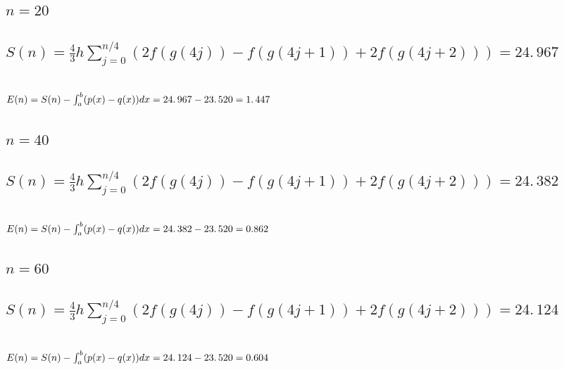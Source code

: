 \documentclass{article}
\begin{document}
\bigskip

\subsection{\protect\bigskip $n=20$}

\subsection{$S(n)=\frac{4}{3}h\sum%
\limits_{j=0}^{n/4}(2f(g(4j))-f(g(4j+1))+2f(g(4j+2)))=\allowbreak
24.\,\allowbreak 967$}

\subsection{$E(n)=S(n)-\protect\int_{a}^{b}(p(x)-q(x))dx\allowbreak
\allowbreak =24.\,\allowbreak 967-23.\,\allowbreak 520=\allowbreak
1.\,\allowbreak 447$}

\subsection{$n=40$}

\subsection{$S(n)=\frac{4}{3}h\sum%
\limits_{j=0}^{n/4}(2f(g(4j))-f(g(4j+1))+2f(g(4j+2)))=\allowbreak
24.\,\allowbreak 382$}

\subsection{$E(n)=S(n)-\protect\int_{a}^{b}(p(x)-q(x))dx\allowbreak
=\allowbreak \allowbreak 24.\,\allowbreak 382-23.\,\allowbreak
520=\allowbreak 0.862\,$}

\subsection{$n=60$}

\subsection{$S(n)=\frac{4}{3}h\sum%
\limits_{j=0}^{n/4}(2f(g(4j))-f(g(4j+1))+2f(g(4j+2)))=24.\,\allowbreak 124$}

\subsection{$E(n)=S(n)-\protect\int_{a}^{b}(p(x)-q(x))dx\allowbreak
=\allowbreak \allowbreak 24.\,\allowbreak 124-23.\,\allowbreak
520=\allowbreak 0.604\,$}
\end{document}
